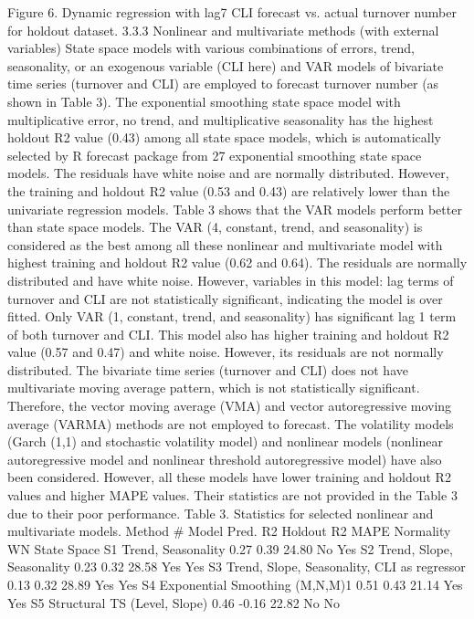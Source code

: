 Figure 6. Dynamic regression with lag7 CLI forecast vs. actual turnover number for holdout dataset. 
3.3.3    Nonlinear and multivariate methods (with external variables)
State space models with various combinations of errors, trend, seasonality, or an exogenous variable (CLI here) and VAR models of bivariate time series (turnover and CLI) are employed to forecast turnover number (as shown in Table 3). The exponential smoothing state space model with multiplicative error, no trend, and multiplicative seasonality has the highest holdout R2 value (0.43) among all state space models, which is automatically selected by R forecast package from 27 exponential smoothing state space models. The residuals have white noise and are normally distributed. However, the training and holdout R2 value (0.53 and 0.43) are relatively lower than the univariate regression models. 
Table 3 shows that the VAR models perform better than state space models. The VAR (4, constant, trend, and seasonality) is considered as the best among all these nonlinear and multivariate model with highest training and holdout R2 value (0.62 and 0.64). The residuals are normally distributed and have white noise. However, variables in this model: lag terms of turnover and CLI are not statistically significant, indicating the model is over fitted. Only VAR (1, constant, trend, and seasonality) has significant lag 1 term of both turnover and CLI. This model also has higher training and holdout R2 value (0.57 and 0.47) and white noise. However, its residuals are not normally distributed. 
The bivariate time series (turnover and CLI) does not have multivariate moving average pattern, which is not statistically significant. Therefore, the vector moving average (VMA) and vector autoregressive moving average (VARMA) methods are not employed to forecast. The volatility models (Garch (1,1) and stochastic volatility model) and nonlinear models (nonlinear autoregressive model and nonlinear threshold autoregressive model) have also been considered. However, all these models have lower training and holdout R2 values and higher MAPE values. Their statistics are not provided in the Table 3 due to their poor performance.
Table 3. Statistics for selected nonlinear and multivariate models.
Method	#	Model	Pred. R2	Holdout R2	MAPE	Normality	WN
State Space 
	S1	Trend, Seasonality	0.27	0.39	24.80	No	Yes
	S2	Trend, Slope, Seasonality	0.23	0.32	28.58	Yes	Yes
	S3	Trend, Slope, Seasonality, CLI as regressor	0.13	0.32	28.89	Yes	Yes
	S4	Exponential Smoothing (M,N,M)1	0.51	0.43	21.14	Yes	Yes
	S5	Structural TS (Level, Slope) 	0.46	-0.16	22.82	No	No
